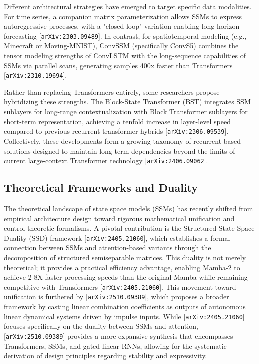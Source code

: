\documentclass[11pt]{article}
\begin{document}
Different architectural strategies have emerged to target specific data modalities. For time series, a companion matrix parameterization allows SSMs to express autoregressive processes, with a "closed-loop" variation enabling long-horizon forecasting [\texttt{arXiv:2303.09489}]. In contrast, for spatiotemporal modeling (e.g., Minecraft or Moving-MNIST), ConvSSM (specifically ConvS5) combines the tensor modeling strengths of ConvLSTM with the long-sequence capabilities of SSMs via parallel scans, generating samples 400x faster than Transformers [\texttt{arXiv:2310.19694}].

Rather than replacing Transformers entirely, some researchers propose hybridizing these strengths. The Block-State Transformer (BST) integrates SSM sublayers for long-range contextualization with Block Transformer sublayers for short-term representation, achieving a tenfold increase in layer-level speed compared to previous recurrent-transformer hybrids [\texttt{arXiv:2306.09539}]. Collectively, these developments form a growing taxonomy of recurrent-based solutions designed to maintain long-term dependencies beyond the limits of current large-context Transformer technology [\texttt{arXiv:2406.09062}].

\subsection{Theoretical Frameworks and Duality}

The theoretical landscape of state space models (SSMs) has recently shifted from empirical architecture design toward rigorous mathematical unification and control-theoretic formalisms. A pivotal contribution is the Structured State Space Duality (SSD) framework [\texttt{arXiv:2405.21060}], which establishes a formal connection between SSMs and attention-based variants through the decomposition of structured semiseparable matrices. This duality is not merely theoretical; it provides a practical efficiency advantage, enabling Mamba-2 to achieve 2-8X faster processing speeds than the original Mamba while remaining competitive with Transformers [\texttt{arXiv:2405.21060}]. This movement toward unification is furthered by [\texttt{arXiv:2510.09389}], which proposes a broader framework by casting linear combination coefficients as outputs of autonomous linear dynamical systems driven by impulse inputs. While [\texttt{arXiv:2405.21060}] focuses specifically on the duality between SSMs and attention, [\texttt{arXiv:2510.09389}] provides a more expansive synthesis that encompasses Transformers, SSMs, and gated linear RNNs, allowing for the systematic derivation of design principles regarding stability and expressivity.
\end{document}
